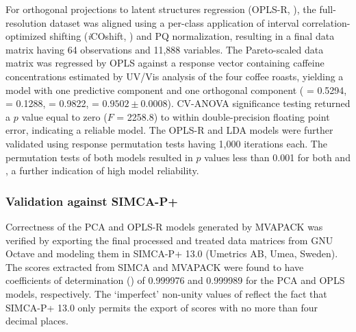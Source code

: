\begin{doublespace}
For orthogonal projections to latent structures regression
(OPLS-R, \cite{trygg:jchemo2002}), the full-resolution dataset was aligned
using a per-class application of interval correlation-optimized shifting
(\emph{i}COshift, \cite{savorani:jmr2010}) and PQ normalization, resulting
in a final data matrix having 64 observations and 11,888 variables. The
Pareto-scaled data matrix was regressed by OPLS against a response vector
containing caffeine concentrations estimated by UV/Vis analysis of the four
coffee roasts, yielding a model with one predictive component and one
orthogonal component (\rsqxp{} = 0.5294, \rsqxo{} = 0.1288, \rsqy{} = 0.9822,
\qsq{} = $0.9502 \pm 0.0008$). CV-ANOVA significance testing returned a $p$
value equal to zero ($F$ = 2258.8) to within double-precision floating point
error, indicating a reliable model. The OPLS-R and LDA models were further
validated using response permutation tests having 1,000 iterations each. The
permutation tests of both models resulted in $p$ values less than 0.001 for
both \rsqy{} and \qsq{}, a further indication of high model reliability.
\end{doublespace}

\subsubsection{Validation against SIMCA-P+}

\begin{doublespace}
Correctness of the PCA and OPLS-R models generated by MVAPACK was verified by
exporting the final processed and treated data matrices from GNU Octave and
modeling them in SIMCA-P+ 13.0 (Umetrics AB, Umea, Sweden). The scores
extracted from SIMCA and MVAPACK were found to have coefficients of
determination (\rsq{}) of 0.999976 and 0.999989 for the PCA and OPLS models,
respectively. The `imperfect' non-unity values of \rsq{} reflect the fact that
SIMCA-P+ 13.0 only permits the export of scores with no more than four decimal
places.
\end{doublespace}

